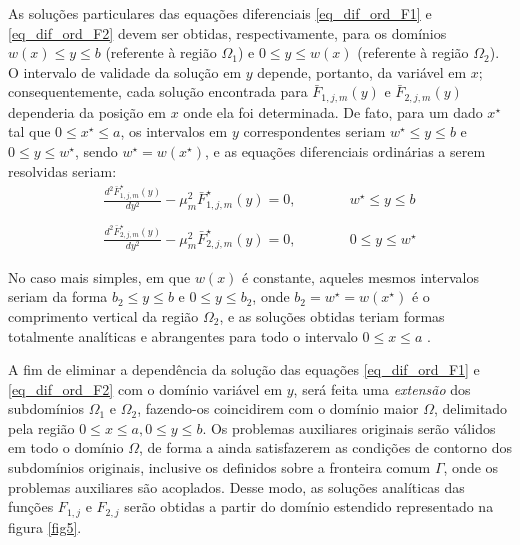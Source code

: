 As soluções particulares das equações diferenciais \eqref{eq_dif_ord_F1} e \eqref{eq_dif_ord_F2} devem ser obtidas, respectivamente, para os domínios $w(x) \le y \le b$ (referente à região $\Omega_1$) e $0 \le y \le w(x)$ (referente à região $\Omega_2$). O intervalo de validade da solução em $y$ depende, portanto, da variável em $x$; consequentemente, cada solução encontrada para $\bar{F}_{1,j,m}(y)$ e $\bar{F}_{2,j,m}(y)$ dependeria da posição em $x$ onde ela foi determinada. De fato, para um dado $x^\star$ tal que $0 \le x^\star \le a$, os intervalos em $y$ correspondentes seriam $w^\star \le y \le b$ e $0 \le y \le w^\star$, sendo $w^\star = w(x^\star)$, e as equações diferenciais ordinárias a serem resolvidas seriam:
\begin{align}
\frac{d^2 \bar{F}_{1,j,m}^\star(y)}{d y^2}
-
\mu_m^2 \bar{F}^\star_{1,j,m}(y) = 0, \quad\quad\quad& w^\star \le y \le b \label{eq_dif_ord_F1_particular}
\\ \nonumber \\
\frac{d^2 \bar{F}^\star_{2,j,m}(y)}{d y^2}
-
\mu_m^2 \bar{F}^\star_{2,j,m}(y) = 0, \quad\quad\quad& 0 \le y \le w^\star \label{eq_dif_ord_F2_particular}
\end{align}


No caso mais simples, em que $w(x)$ é constante, aqueles mesmos intervalos seriam da forma $b_2 \le y \le b$ e $0 \le y \le b_2$, onde $b_2 = w^\star = w(x^\star)$ é o comprimento vertical da região $\Omega_2$, e as soluções obtidas teriam formas totalmente analíticas e abrangentes para todo o intervalo $0 \le x \le a$ \citep{tese_padilha}.

A fim de eliminar a dependência da solução das equações \eqref{eq_dif_ord_F1} e \eqref{eq_dif_ord_F2} com o domínio variável em $y$, será feita uma \textit{extensão} dos subdomínios $\Omega_1$ e $\Omega_2$, fazendo-os coincidirem com o domínio maior $\Omega$, delimitado pela região $0 \le x \le a, 0 \le y \le b$. Os problemas auxiliares originais serão válidos em todo o domínio $\Omega$, de forma a ainda
satisfazerem as condições de contorno dos subdomínios originais, inclusive os definidos sobre a fronteira comum $\Gamma$, onde os problemas auxiliares são acoplados.
Desse modo, as soluções analíticas das funções $F_{1, j}$ e $F_{2, j}$ serão obtidas a partir do domínio estendido representado na figura \ref{fig5}.

